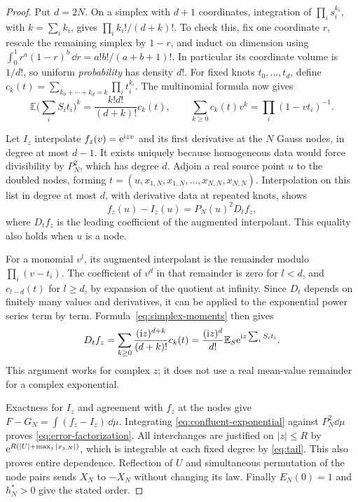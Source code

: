 \begin{proof}
Put \(d=2N\). On a simplex with \(d+1\) coordinates, integration
of \(\prod_i s_i^{k_i}\), with \(k=\sum_i k_i\), gives
\(\prod_i k_i!/(d+k)!\). To check this, fix one coordinate \(r\),
rescale the remaining simplex by \(1-r\), and induct on dimension
using \(\int_0^1r^a(1-r)^b\,\dd r=a!b!/(a+b+1)!\).
In particular its coordinate volume is \(1/d!\), so uniform
\emph{probability} has density \(d!\).
For fixed knots \(t_0,\ldots,t_d\), define
\(c_k(t)=\sum_{k_0+\cdots+k_d=k}\prod_i t_i^{k_i}\). The
multinomial formula now gives
\begin{equation}
 \mathbb E\Big(\sum_iS_it_i\Big)^k
   =\frac{k!d!}{(d+k)!}c_k(t),\qquad
 \sum_{k\ge0}c_k(t)v^k=\prod_i(1-vt_i)^{-1}.
 \label{eq:simplex-moments}
\end{equation}

Let \(I_z\) interpolate \(f_z(v)=\mathrm e^{\mathrm i zv}\) and its first
derivative at the \(N\) Gauss nodes, in degree at most \(d-1\).
It exists uniquely because homogeneous data would force divisibility
by \(P_N^2\), which has degree \(d\). Adjoin a real source point
\(u\) to the doubled nodes, forming
\(t=(u,x_{1,N},x_{1,N},\ldots,x_{N,N},x_{N,N})\). Interpolation
on this list in degree at most \(d\), with derivative data at
repeated knots, shows
\[
 f_z(u)-I_z(u)=P_N(u)^2D_tf_z,
\]
where \(D_tf_z\) is the leading coefficient of the augmented
interpolant. This equality also holds when \(u\) is a node.

For a monomial \(v^l\), its augmented interpolant is the remainder
modulo \(\prod_i(v-t_i)\). The coefficient of \(v^d\) in that
remainder is zero for \(l<d\), and \(c_{l-d}(t)\) for \(l\ge d\),
by expansion of the quotient at infinity. Since \(D_t\) depends
on finitely many values and derivatives, it can be applied to the
exponential power series term by term. Formula~\eqref{eq:simplex-moments}
then gives
\begin{equation}
 D_tf_z=\sum_{k\ge0}\frac{(\mathrm i z)^{d+k}}{(d+k)!}c_k(t)
       =\frac{(\mathrm i z)^d}{d!}
         \mathbb E_S\mathrm e^{\mathrm i z\sum_i S_it_i}.
 \label{eq:confluent-exponential}
\end{equation}
This argument works for complex \(z\); it does not use a
real mean-value remainder for a complex exponential.

Exactness for \(I_z\) and agreement with \(f_z\) at the nodes give
\(F-G_N=\int(f_z-I_z)\,\dd\mu\). Integrating
\eqref{eq:confluent-exponential} against \(P_N^2\dd\mu\) proves
\eqref{eq:error-factorization}. All interchanges are justified on
\(|z|\le R\) by \(\mathrm e^{R(|U|+\max_j|x_{j,N}|)}\), which is
integrable at each fixed degree by \eqref{eq:tail}. This also proves
entire dependence. Reflection of \(U\) and simultaneous permutation
of the node pairs sends \(X_N\) to \(-X_N\) without changing its
law. Finally \(E_N(0)=1\) and \(h_N^*>0\) give the stated order.
\end{proof}

